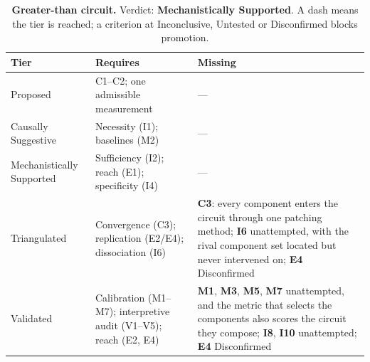 \begin{table}[H]
\centering
\footnotesize
\caption{\textbf{Greater-than circuit.} Verdict: \textbf{Mechanistically Supported}. A dash means the tier is reached; a criterion at
Inconclusive, Untested or Disconfirmed blocks promotion.}
\label{tab:greater_than-verdict}
\renewcommand{\arraystretch}{1.18}
\begin{tabular}{@{}l>{\raggedright\arraybackslash}p{3.6cm}>{\raggedright\arraybackslash}p{4.4cm}@{}}
\toprule
\textbf{Tier} & \textbf{Requires} & \textbf{Missing} \\
\midrule
Proposed & C1--C2; one admissible measurement & --- \\
\addlinespace[2pt]
Causally Suggestive & Necessity (I1); baselines (M2) & --- \\
\addlinespace[2pt]
Mechanistically Supported & Sufficiency (I2); reach (E1); specificity (I4) & --- \\
\addlinespace[2pt]
Triangulated & Convergence (C3); replication (E2/E4); dissociation (I6) & \textbf{C3}: every component enters the circuit through one patching method; \textbf{I6} unattempted, with the rival component set located but never intervened on; \textbf{E4} Disconfirmed \\
\addlinespace[2pt]
Validated & Calibration (M1--M7); interpretive audit (V1--V5); reach (E2, E4) & \textbf{M1}, \textbf{M3}, \textbf{M5}, \textbf{M7} unattempted, and the metric that selects the components also scores the circuit they compose; \textbf{I8}, \textbf{I10} unattempted; \textbf{E4} Disconfirmed \\
\bottomrule
\end{tabular}
\end{table}
